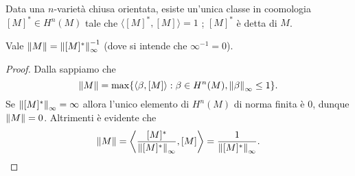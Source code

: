 Data una $n$-varietà chiusa orientata, esiste un'unica classe in coomologia $[M]^*\in H^n(M)$ tale che $\langle[M]^*,[M]\rangle=1$ ; $[M]^*$ è detta  di $M$.
\begin{proposition}
Vale $\left\lVert M\right\rVert=\left\lVert [M]^*\right\rVert_\infty^{-1}$ (dove si intende che $\infty^{-1}=0$).
\end{proposition}
\begin{proof}
Dalla  sappiamo che
\[
\left\lVert M\right\rVert=\max\{\langle\beta,[M]\rangle:\beta\in H^n(M),\left\lVert \beta\right\rVert_\infty\le 1\}.
\]
Se $\left\lVert [M]^*\right\rVert_\infty=\infty$ allora l'unico elemento di $H^n(M)$ di norma finita è $0$, dunque $\left\lVert M\right\rVert=0$. Altrimenti è evidente che
\[
\left\lVert M\right\rVert=\left\langle\frac{[M]^*}{\left\lVert [M]^*\right\rVert_\infty},[M]\right\rangle=\frac{1}{\left\lVert [M]^*\right\rVert_\infty}.\qedhere
\]
\end{proof}